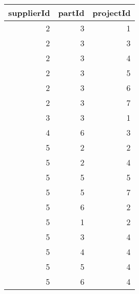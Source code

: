 \begin{tabular}{rrr}
\toprule
supplierId & partId & projectId \\
\midrule
2 & 3 & 1 \\
2 & 3 & 3 \\
2 & 3 & 4 \\
2 & 3 & 5 \\
2 & 3 & 6 \\
2 & 3 & 7 \\
3 & 3 & 1 \\
4 & 6 & 3 \\
5 & 2 & 2 \\
5 & 2 & 4 \\
5 & 5 & 5 \\
5 & 5 & 7 \\
5 & 6 & 2 \\
5 & 1 & 2 \\
5 & 3 & 4 \\
5 & 4 & 4 \\
5 & 5 & 4 \\
5 & 6 & 4 \\
\bottomrule
\end{tabular}
